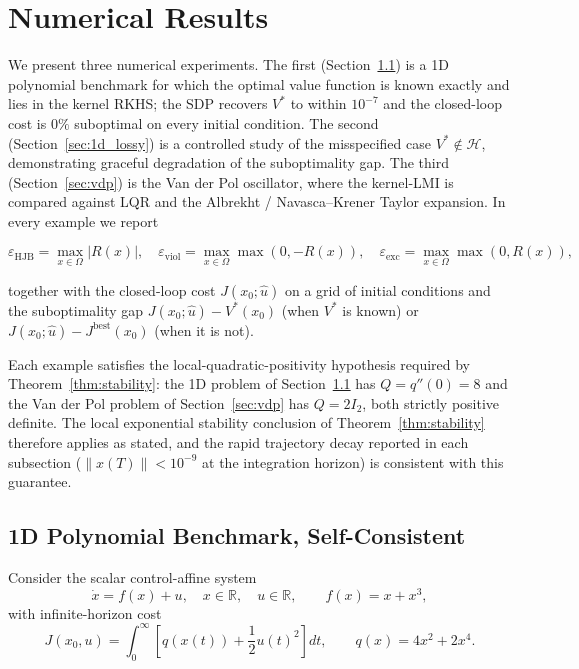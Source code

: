 \documentclass[11pt]{article}
\begin{document}
\section{Numerical Results}
\label{sec:numerical}

We present three numerical experiments. The first (Section~\ref{sec:1d_consistent}) is a 1D polynomial benchmark for which the optimal value function is known exactly and lies in the kernel RKHS; the SDP recovers $V^*$ to within $10^{-7}$ and the closed-loop cost is $0\%$ suboptimal on every initial condition. The second (Section~\ref{sec:1d_lossy}) is a controlled study of the misspecified case $V^*\notin\mathcal{H}$, demonstrating graceful degradation of the suboptimality gap. The third (Section~\ref{sec:vdp}) is the Van der Pol oscillator, where the kernel-LMI is compared against LQR and the Albrekht / Navasca--Krener Taylor expansion. In every example we report

\[
\varepsilon_{\mathrm{HJB}} = \max_{x\in\Omega}|R(x)|,\quad
\varepsilon_{\mathrm{viol}} = \max_{x\in\Omega}\max(0,-R(x)),\quad
\varepsilon_{\mathrm{exc}} = \max_{x\in\Omega}\max(0,R(x)),
\]

together with the closed-loop cost $J(x_0;\hat u)$ on a grid of initial conditions and the suboptimality gap $J(x_0;\hat u) - V^*(x_0)$ (when $V^*$ is known) or $J(x_0;\hat u) - J^{\mathrm{best}}(x_0)$ (when it is not).

Each example satisfies the local-quadratic-positivity hypothesis required by Theorem~\ref{thm:stability}: the 1D problem of Section~\ref{sec:1d_consistent} has $Q = q''(0) = 8$ and the Van der Pol problem of Section~\ref{sec:vdp} has $Q = 2I_2$, both strictly positive definite. The local exponential stability conclusion of Theorem~\ref{thm:stability} therefore applies as stated, and the rapid trajectory decay reported in each subsection ($\|x(T)\| < 10^{-9}$ at the integration horizon) is consistent with this guarantee.

\subsection{1D Polynomial Benchmark, Self-Consistent}
\label{sec:1d_consistent}

Consider the scalar control-affine system
\begin{equation}
\dot{x} = f(x) + u, \quad x \in \mathbb{R}, \quad u \in \mathbb{R}, \qquad f(x) = x + x^3,
\label{eq:scalar_system}
\end{equation}
with infinite-horizon cost
\begin{equation}
J(x_0, u) = \int_0^\infty \left[ q(x(t)) + \frac{1}{2}u(t)^2 \right] dt,\qquad
q(x) = 4x^2 + 2x^4.
\label{eq:cost_functional}
\end{equation}
\end{document}
